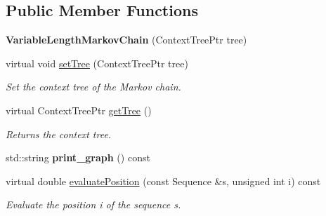 \subsection*{Public Member Functions}
\begin{DoxyCompactItemize}
\item 
\mbox{\label{classtops_1_1VariableLengthMarkovChain_a72af5f01bdfe19d208e10277f10f3dd0}} 
{\bfseries Variable\+Length\+Markov\+Chain} (Context\+Tree\+Ptr tree)
\item 
\mbox{\label{classtops_1_1VariableLengthMarkovChain_acb3cebd623935ef2a233906dcfcaf162}} 
virtual void \hyperlink{classtops_1_1VariableLengthMarkovChain_acb3cebd623935ef2a233906dcfcaf162}{set\+Tree} (Context\+Tree\+Ptr tree)
\begin{DoxyCompactList}\small\item\em Set the context tree of the Markov chain. \end{DoxyCompactList}\item 
\mbox{\label{classtops_1_1VariableLengthMarkovChain_a4f9d9e692bd9540184661b000c856e6c}} 
virtual Context\+Tree\+Ptr \hyperlink{classtops_1_1VariableLengthMarkovChain_a4f9d9e692bd9540184661b000c856e6c}{get\+Tree} ()
\begin{DoxyCompactList}\small\item\em Returns the context tree. \end{DoxyCompactList}\item 
\mbox{\label{classtops_1_1VariableLengthMarkovChain_a3ea4dd0e1cbaa06a8a3212f06bc37013}} 
std\+::string {\bfseries print\+\_\+graph} () const
\item 
\mbox{\label{classtops_1_1VariableLengthMarkovChain_aa6bda128a353c08ba7487e0a7c2c3a4f}} 
virtual double \hyperlink{classtops_1_1VariableLengthMarkovChain_aa6bda128a353c08ba7487e0a7c2c3a4f}{evaluate\+Position} (const Sequence \&s, unsigned int i) const
\begin{DoxyCompactList}\small\item\em Evaluate the position i of the sequence s. \end{DoxyCompactList}\item 

\end{DoxyCompactItemize}
